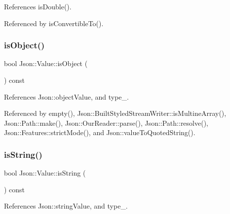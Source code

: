References is\+Double().



Referenced by is\+Convertible\+To().

\mbox{\label{classJson_1_1Value_a8cf96c0f2a552051fcfc78ffee60e037_a8cf96c0f2a552051fcfc78ffee60e037}} 
\subsubsection{\texorpdfstring{is\+Object()}{isObject()}}
{\footnotesize\ttfamily bool Json\+::\+Value\+::is\+Object (\begin{DoxyParamCaption}{ }\end{DoxyParamCaption}) const}



References Json\+::object\+Value, and type\+\_\+.



Referenced by empty(), Json\+::\+Built\+Styled\+Stream\+Writer\+::is\+Multine\+Array(), Json\+::\+Path\+::make(), Json\+::\+Our\+Reader\+::parse(), Json\+::\+Path\+::resolve(), Json\+::\+Features\+::strict\+Mode(), and Json\+::value\+To\+Quoted\+String().

\mbox{\label{classJson_1_1Value_a71e1f82cf1c3eaf969d400dcffb163a6_a71e1f82cf1c3eaf969d400dcffb163a6}} 
\subsubsection{\texorpdfstring{is\+String()}{isString()}}
{\footnotesize\ttfamily bool Json\+::\+Value\+::is\+String (\begin{DoxyParamCaption}{ }\end{DoxyParamCaption}) const}



References Json\+::string\+Value, and type\+\_\+.

\mbox{\label{classJson_1_1Value_abdda463d3269015f883587349726cfbc_abdda463d3269015f883587349726cfbc}} 
